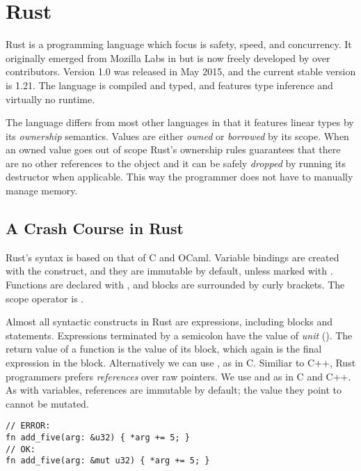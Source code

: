 \documentclass[b5paper,twoside]{report}
\begin{document}
\section{Rust}
Rust is a programming language which focus is safety, speed, and concurrency.
It originally emerged from Mozilla Labs in  but is now freely developed
by over  contributors.
Version 1.0 was released in May 2015, and the current stable version is 1.21.
The language is compiled and typed, and features
type inference and virtually no runtime.

The language differs from most other languages in that it features linear types
by its \emph{ownership} semantics.
Values are either \emph{owned} or \emph{borrowed} by its scope.
When an owned value goes out of scope Rust's ownership rules guarantees that
there are no other references to the object and it can be safely \emph{dropped}
by running its destructor when applicable.
This way the programmer does not have to manually manage memory.

\subsection{A Crash Course in Rust}

Rust's syntax is based on that of C and OCaml.
Variable bindings are created with the  construct,
and they are immutable by default, unless marked with .
Functions are declared with , and blocks are surrounded by curly brackets.
The scope operator is \code{::}.

Almost all syntactic constructs in Rust are expressions, including blocks and
 statements.
Expressions terminated by a semicolon have the value of \emph{unit} (\code{()}).
The return value of a function is the value of its block, which again is the final
expression in the block. Alternatively we can use , as in C.
Similiar to C++, Rust programmers prefers \emph{references} over raw pointers.
We use \code{\&} and \code{*} as in C and C++.
As with variables, references are immutable by default; the value they point
to cannot be mutated.

\begin{lstlisting}[firstnumber=last]
// ERROR:
fn add_five(arg: &u32) { *arg += 5; }
// OK:
fn add_five(arg: &mut u32) { *arg += 5; }
\end{lstlisting}
\end{document}
